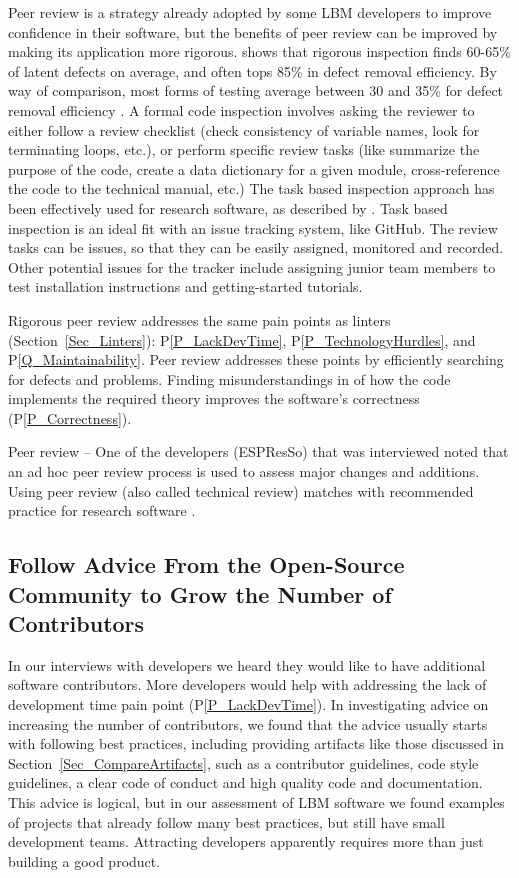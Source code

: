 \documentclass[final, 3p, times, authoryear]{elsarticle}
\newcommand{\ppref}[1]{P\ref{#1}}
\begin{document}
Peer review is a strategy already adopted by some LBM developers to improve
confidence in their software, but the benefits of peer review can be improved by
making its application more rigorous. \citet{Jones2008} shows that rigorous
inspection finds 60-65\% of latent defects on average, and often tops 85\% in
defect removal efficiency.  By way of comparison, most forms of testing average
between 30 and 35\% for defect removal efficiency \citep{EbertAndJones2009,
Jones2008}.  A formal code inspection involves asking the reviewer to either
follow a review checklist (check consistency of variable names, look for
terminating loops, etc.), or perform specific review tasks (like summarize the
purpose of the code, create a data dictionary for a given module,
cross-reference the code to the technical manual, etc.) The task based
inspection approach has been effectively used for research software, as
described by \citet{KellyAndShepard2000}. Task based inspection is an ideal fit
with an issue tracking system, like GitHub.  The review tasks can be issues, so
that they can be easily assigned, monitored and recorded.  Other potential
issues for the tracker include assigning junior team members to test
installation instructions and getting-started tutorials.

Rigorous peer review addresses the same pain points as linters
(Section~\ref{Sec_Linters}): \ppref{P_LackDevTime}, \ppref{P_TechnologyHurdles},
and \ppref{Q_Maintainability}. Peer review addresses these points by efficiently
searching for defects and problems.  Finding misunderstandings in of how the
code implements the required theory improves the software's correctness
(\ppref{P_Correctness}).

Peer review --  One of the developers (ESPResSo) that was interviewed noted that
an ad hoc peer review process is used to assess major changes and additions.
Using peer review (also called technical review) matches with recommended
practice for research software \citep{HerouxEtAl2008, Givler2020, OrvizEtAl2017,
USGS2019}.

\subsection{Follow Advice From the Open-Source Community to Grow the Number of Contributors} \label{Sec_GrowContributors}

In our interviews with developers we heard they would like to have additional
software contributors.  More developers would help with addressing the lack of
development time pain point (\ppref{P_LackDevTime}).  In investigating advice on
increasing the number of contributors, we found that the advice usually starts
with following best practices, including providing artifacts like those
discussed in Section~\ref{Sec_CompareArtifacts}, such as a contributor
guidelines, code style guidelines, a clear code of conduct and high quality code
and documentation. This advice is logical, but in our assessment of LBM software
we found examples of projects that already follow many best practices, but still
have small development teams. Attracting developers apparently requires more
than just building a good product.
\end{document}
